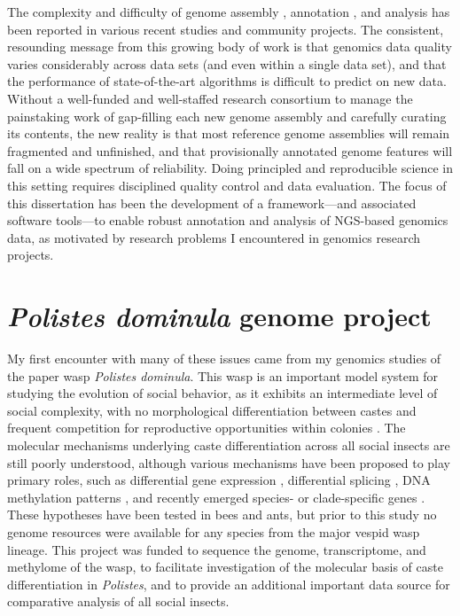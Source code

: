 The complexity and difficulty of genome assembly \cite{Assemblathon1,Assemblathon2,GAGE,QUAST}, annotation \cite{EGASP,Eilbeck,DentonFly}, and analysis \cite{PigWatson,RnaSeqTrim,RnaSeqTrim2} has been reported in various recent studies and community projects.
The consistent, resounding message from this growing body of work is that genomics data quality varies considerably across data sets (and even within a single data set), and that the performance of state-of-the-art algorithms is difficult to predict on new data.
Without a well-funded and well-staffed research consortium to manage the painstaking work of gap-filling each new genome assembly and carefully curating its contents, the new reality is that most reference genome assemblies will remain fragmented and unfinished, and that provisionally annotated genome features will fall on a wide spectrum of reliability.
Doing principled and reproducible science in this setting requires disciplined quality control and data evaluation.
The focus of this dissertation has been the development of a framework---and associated software tools---to enable robust annotation and analysis of NGS-based genomics data, as motivated by research problems I encountered in genomics research projects.

\section{\textit{Polistes dominula} genome project}

My first encounter with many of these issues came from my genomics studies of the paper wasp \textit{Polistes dominula}.
This wasp is an important model system for studying the evolution of social behavior, as it exhibits an intermediate level of social complexity, with no morphological differentiation between castes and frequent competition for reproductive opportunities within colonies \cite{JandtToth}.
The molecular mechanisms underlying caste differentiation across all social insects are still poorly understood, although various mechanisms have been proposed to play primary roles, such as differential gene expression \cite{ChenDiffExp,GrozingerDiffExp,WhitfieldDiffExp,OmettoDiffExp,SimolaDiffExp,HarrisonDiffExp,PcanTrans}, differential splicing \cite{Dnmt3KD}, DNA methylation patterns \cite{Dnmt3KD,Lyko2011}, and recently emerged species- or clade-specific genes \cite{SumnerTRG,JohnsonTRG}.
These hypotheses have been tested in bees and ants, but prior to this study no genome resources were available for any species from the major vespid wasp lineage.
This project was funded to sequence the genome, transcriptome, and methylome of the wasp, to facilitate investigation of the molecular basis of caste differentiation in \textit{Polistes}, and to provide an additional important data source for comparative analysis of all social insects.

